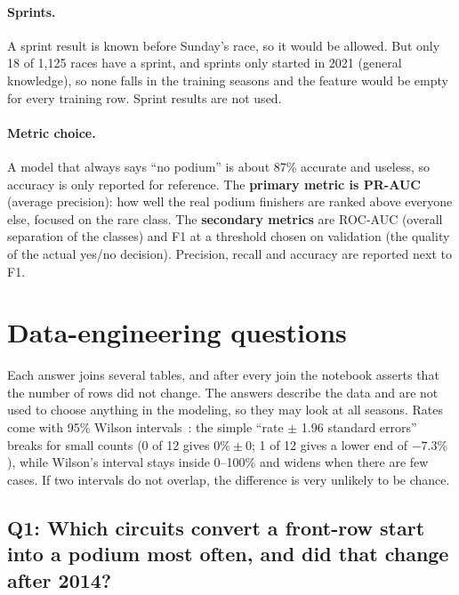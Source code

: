 \documentclass[11pt,a4paper]{article}
\begin{document}
\paragraph{Sprints.} A sprint result is known before Sunday's race, so it would be allowed. But only 18 of 1{,}125 races have a sprint, and sprints only started in 2021 (general knowledge), so none falls in the training seasons and the feature would be empty for every training row. Sprint results are not used.

\paragraph{Metric choice.} A model that always says ``no podium'' is about 87\% accurate and useless, so accuracy is only reported for reference.
The \textbf{primary metric is PR-AUC} (average precision): how well the real podium finishers are ranked above everyone else, focused on the rare class.
The \textbf{secondary metrics} are ROC-AUC (overall separation of the classes) and F1 at a threshold chosen on validation (the quality of the actual yes/no decision). Precision, recall and accuracy are reported next to F1.

\section{Data-engineering questions}

Each answer joins several tables, and after every join the notebook asserts that the number of rows did not change. The answers describe the data and are not used to choose anything in the modeling, so they may look at all seasons.
Rates come with 95\% Wilson intervals~\cite{wilson1927,agresti1998}: the simple ``rate $\pm$ 1.96 standard errors'' breaks for small counts (0 of 12 gives $0\% \pm 0$; 1 of 12 gives a lower end of $-7.3\%$), while Wilson's interval stays inside 0--100\% and widens when there are few cases. If two intervals do not overlap, the difference is very unlikely to be chance.

\subsection{Q1: Which circuits convert a front-row start into a podium most often, and did that change after 2014?}
\end{document}
